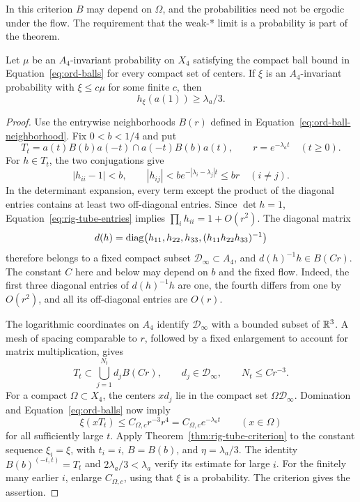 In this criterion \(B\) may depend on \(\Omega\), and the
probabilities need not be ergodic under the flow.  The requirement
that the weak-* limit is a probability is part of the theorem.

\begin{proposition}
\label{prop:rig-dominated-entropy}
Let \(\mu\) be an \(A_4\)-invariant probability on \(X_4\) satisfying
the compact ball bound in Equation~\eqref{eq:ord-balls} for every compact set of
centers.  If \(\xi\) is an \(A_4\)-invariant probability with
\(\xi\le c\mu\) for some finite \(c\), then
\[
 h_\xi(a(1))\ge \lambda_a/3.
\]
\end{proposition}

\begin{proof}
Use the entrywise neighborhoods \(B(r)\) defined in
Equation~\eqref{eq:ord-ball-neighborhood}.  Fix \(0<b<1/4\) and put
\[
 T_t=a(t)B(b)a(-t)\cap a(-t)B(b)a(t),
 \qquad r=e^{-\lambda_a t}\quad(t\ge0).
\]
For \(h\in T_t\), the two conjugations give
\begin{equation}\label{eq:rig-tube-entries}
 |h_{ii}-1|<b,\qquad
 |h_{ij}|<b e^{-|\lambda_i-\lambda_j|t}\le br
 \quad(i\ne j).
\end{equation}
In the determinant expansion, every term except the product of the
diagonal entries contains at least two off-diagonal entries.
Since \(\det h=1\), Equation~\eqref{eq:rig-tube-entries} implies
\(\prod_i h_{ii}=1+O(r^2)\).  The diagonal matrix
\[
 d(h)=\operatorname{diag}\bigl(h_{11},h_{22},h_{33},
                         (h_{11}h_{22}h_{33})^{-1}\bigr)
\]
therefore belongs to a fixed compact subset
\(\mathcal D_\infty\subset A_4\), and \(d(h)^{-1}h\in B(Cr)\).
The constant \(C\) here and below may depend on \(b\) and the fixed flow.
Indeed, the first three diagonal entries of \(d(h)^{-1}h\) are one,
the fourth differs from one by \(O(r^2)\), and all its off-diagonal
entries are \(O(r)\).

The logarithmic coordinates on \(A_4\) identify
\(\mathcal D_\infty\) with a bounded subset of \(\mathbb R^3\).
A mesh of spacing comparable to \(r\), followed by a fixed enlargement
to account for matrix multiplication, gives
\begin{equation}\label{eq:rig-tube-cover}
 T_t\subset\bigcup_{j=1}^{N_t}d_jB(Cr),
 \qquad d_j\in\mathcal D_\infty,\qquad N_t\le Cr^{-3}.
\end{equation}
For a compact \(\Omega\subset X_4\), the centers \(xd_j\) lie in the
compact set \(\Omega\mathcal D_\infty\).  Domination and
Equation~\eqref{eq:ord-balls} now imply
\begin{equation}\label{eq:rig-tube-mass}
 \xi(xT_t)\le C_{\Omega,c}r^{-3}r^4
             =C_{\Omega,c}e^{-\lambda_a t}
 \qquad(x\in\Omega)
\end{equation}
for all sufficiently large \(t\).
Apply Theorem~\ref{thm:rig-tube-criterion} to the constant sequence
\(\xi_i=\xi\), with \(t_i=i\), \(B=B(b)\), and
\(\eta=\lambda_a/3\).  The identity \(B(b)^{(-t,t)}=T_t\) and
\(2\lambda_a/3<\lambda_a\) verify its estimate for large \(i\).
For the finitely many earlier \(i\), enlarge \(C_{\Omega,c}\), using
that \(\xi\) is a probability.  The criterion gives the assertion.
\end{proof}

